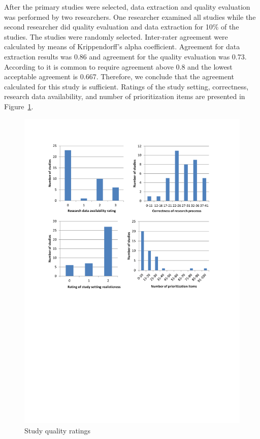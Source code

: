 After the primary studies were selected, data extraction and quality evaluation was performed by two researchers.
One researcher examined all studies while the second researcher did quality evaluation and data extraction for 10\% of the studies. 
The studies were randomly selected.
Inter-rater agreement were calculated by means of Krippendorff's alpha coefficient.
Agreement for data extraction results was 0.86 and agreement for the quality evaluation was 0.73.
According to \cite{Krippendorff2004a} it is common to require agreement above 0.8 and the lowest acceptable agreement is 0.667. Therefore, we conclude that the agreement calculated for this study is sufficient.
Ratings of the study setting, correctness, research data availability, and number of prioritization items are presented in Figure~\ref{fig:qeResults}.

\begin{figure}
	\center
\includegraphics[bb=60bp 360bp 560bp 790bp,clip,scale=0.75]{fig/qeResults}
\caption{\label{fig:qeResults}Study quality ratings}
\end{figure}

